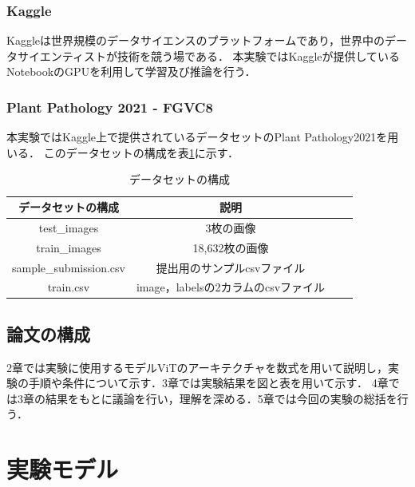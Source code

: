 \documentclass[a4paper, oneside, openany, dvipdfmx]{suribt}%
\newcommand{\tref}[1]{表\ref{#1}}
\begin{document}
\subsection{Kaggle}
Kaggleは世界規模のデータサイエンスのプラットフォームであり，世界中のデータサイエンティストが技術を競う場である．
本実験ではKaggleが提供しているNotebookのGPUを利用して学習及び推論を行う．
\subsection{Plant Pathology 2021 - FGVC8}
本実験ではKaggle上で提供されているデータセットのPlant Pathology2021を用いる．
このデータセットの構成を\tref{tb:dataset}に示す．
\begin{table}[htbp]
  \caption{データセットの構成}
  \label{tb:dataset}
  \centering\begin{tabular}{c|ccc}\hline
    データセットの構成 & 説明\\ \hline
    test\_images & 3枚の画像\\ \hline
    train\_images & 18,632枚の画像\\ \hline
    sample\_submission.csv & 提出用のサンプルcsvファイル\\ \hline
    train.csv & image，labelsの2カラムのcsvファイル\\ \hline
  \end{tabular}
\end{table}
\section{論文の構成}
2章では実験に使用するモデルViTのアーキテクチャを数式を用いて説明し，実験の手順や条件について示す．3章では実験結果を図と表を用いて示す．
4章では3章の結果をもとに議論を行い，理解を深める．5章では今回の実験の総括を行う．

\chapter{実験モデル}
\end{document}
